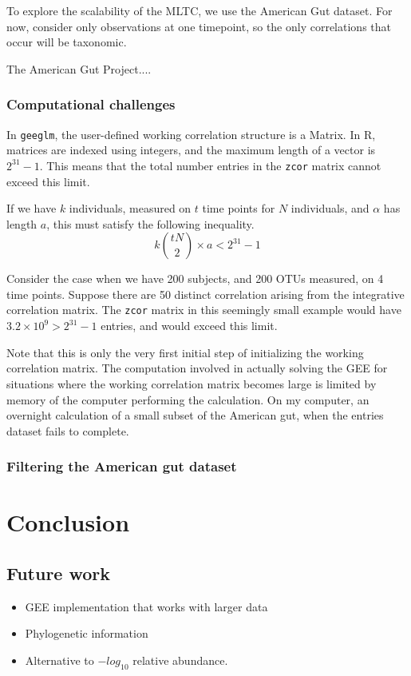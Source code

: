\documentclass[12pt]{article}
\begin{document}
To explore the scalability of the MLTC, we use the American Gut dataset. For now, consider only observations at one timepoint, so the only correlations that occur will be taxonomic.

The American Gut Project....



\subsubsection{Computational challenges}

In \texttt{geeglm}, the user-defined working correlation structure is a Matrix. In R, matrices are indexed using integers, and the maximum length of a vector is $2^{31}-1$. This means that the total number entries in the \texttt{zcor} matrix cannot exceed this limit.

If we have $k$ individuals, measured on $t$ time points for $N$ individuals, and $\alpha$ has length $a$, this must satisfy the following inequality.
$$ k \binom{tN}{2} \times a < 2^{31}-1$$

Consider the case when we have 200 subjects, and 200 OTUs measured, on 4 time points. Suppose there are 50 distinct correlation arising from the integrative correlation matrix.
The \texttt{zcor} matrix in this seemingly small example would have $3.2 \times 10^9 > 2^{31}-1$ entries, and would exceed this limit.

Note that this is only the very first initial step of initializing the working correlation matrix. The computation involved in actually solving the GEE for situations where the working correlation matrix becomes large is limited by memory of the computer performing the calculation. On my computer, an overnight calculation of a small subset of the American gut, when the entries dataset fails to complete.



\subsubsection{Filtering the American gut dataset}


\section{Conclusion}

\subsection{Future work}
\begin{itemize}
  \item GEE implementation that works with larger data
  \item Phylogenetic information
  \item Alternative to $-log_{10}$ relative abundance.
\end{itemize}





\begin{singlespace}
\printbibliography
\end{singlespace}
\end{document}
